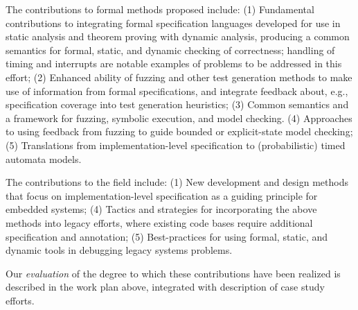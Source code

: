 The contributions to formal methods proposed include: (1)
Fundamental contributions to integrating formal specification
languages developed for use in static analysis and theorem proving
with dynamic analysis, producing a common semantics for formal,
static, and dynamic checking of correctness; handling of timing and
interrupts are notable examples of problems to be addressed in this effort;
(2) Enhanced ability of fuzzing and other test generation methods to
make use of information from formal specifications, and integrate
feedback about, e.g., specification coverage into test generation
heuristics;
(3) Common semantics and a framework for fuzzing, symbolic execution,
and model checking.
(4) Approaches to using feedback from fuzzing to guide bounded or explicit-state model
checking;
(5) Translations from implementation-level specification to
(probabilistic) timed automata models.

The contributions to the field include:
(1)  New development and design methods that focus on
implementation-level specification as a guiding
principle for embedded systems; (4) Tactics and strategies for incorporating the above methods into
legacy efforts, where existing code bases require additional
specification and annotation; (5) Best-practices for using formal, static, and dynamic tools in
debugging legacy systems problems.


Our \emph{evaluation} of the degree to which these contributions have
been realized is described in the work plan above, integrated with
description of case study efforts.